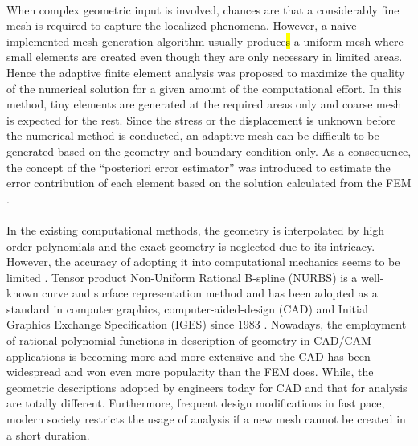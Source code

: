 \paragraph{}
When complex geometric input is involved, chances are that a considerably fine mesh is required to capture the localized phenomena.
However, a naive implemented mesh generation algorithm usually produce\hl{s} a uniform mesh where small elements are created even though they are only necessary in limited areas.
Hence the adaptive finite element analysis was proposed to maximize the quality of the numerical solution for a given amount of the computational effort.
In this method, tiny elements are generated at the required areas only and coarse mesh is expected for the rest.
Since the stress or the displacement is unknown before the numerical method is conducted, an adaptive mesh can be difficult to be generated based on the geometry and boundary condition only.
As a consequence, the concept of the ``posteriori error estimator'' was introduced to estimate the error contribution of each element based on the solution calculated from the FEM \citep{Duval2018, doi:10.1002/gamm.201490020,PRUDHOMME20091887,BAUMAN2009799}.

\paragraph{}
In the existing computational methods, the geometry is interpolated by high order polynomials and the exact geometry is neglected due to its intricacy.
However, the accuracy of adopting it into computational mechanics seems to be limited \citep{Sza2004}.
Tensor product Non-Uniform Rational B-spline (NURBS) is a well-known curve and surface representation method and has been adopted as a standard in computer graphics, computer-aided-design (CAD) \citep{Nas2003} and Initial Graphics Exchange Specification (IGES) since 1983 \citep{IGES1983}.
Nowadays, the employment of rational polynomial functions in description of geometry in CAD/CAM applications is becoming more and more extensive \citep{Pie1987} and the CAD has been widespread and won even more popularity than the FEM does.
While, the geometric descriptions adopted by engineers today for CAD and that for analysis are totally different.
Furthermore, frequent design modifications in fast pace, modern society restricts the usage of analysis if a new mesh cannot be created in a short duration.
